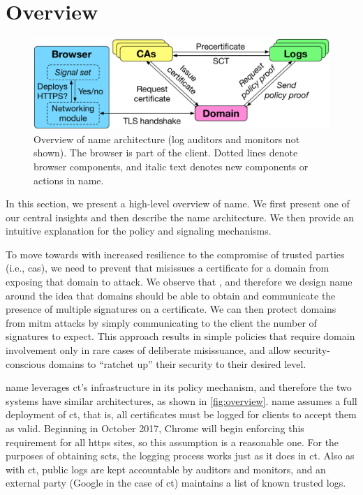 \section{Overview}
\label{sec:overview}

\begin{figure}
  \centering \includegraphics[width=\linewidth]{fig/overview} \caption{Overview
    of \ac{name} architecture (log auditors and monitors not shown). The browser
    is part of the client. Dotted lines denote browser components, and italic
    text denotes new components or actions in \ac{name}.}
  \label{fig:overview}
\end{figure}

In this section, we present a high-level overview of \ac{name}. We first present
one of our central insights and then describe the \ac{name} architecture. We
then provide an intuitive explanation for the policy and signaling mechanisms.

To move towards  with increased resilience to the compromise of trusted
parties (i.e., \acp{ca}), we need to prevent  that misissues a
certificate for a domain from exposing that domain to  attack. We
observe that , and therefore we design
\ac{name} around the idea that domains should be able to obtain and communicate
the presence of multiple signatures on a certificate. We can then protect
domains from \ac{mitm} attacks by simply communicating to the client the number
of signatures to expect. This approach results in simple policies that require
domain involvement only in rare cases of deliberate misissuance, and allow
security-conscious domains to ``ratchet up'' their security to their desired
level.

\ac{name} leverages \ac{ct}'s infrastructure in its policy mechanism, and
therefore the two systems have similar architectures, as shown in
\autoref{fig:overview}.  \ac{name} assumes a full deployment of
\ac{ct}, that is, all certificates must be logged for clients to accept them as
valid. Beginning in October 2017, Chrome will begin enforcing this requirement
for all \ac{https} sites, so this assumption is a reasonable one. For the
purposes of obtaining \acp{sct}, the logging process works just as it does in
\ac{ct}. Also as with \ac{ct}, public logs are kept accountable by auditors and
monitors, and an external party (Google in the case of \ac{ct}) maintains a list
of known trusted logs.

